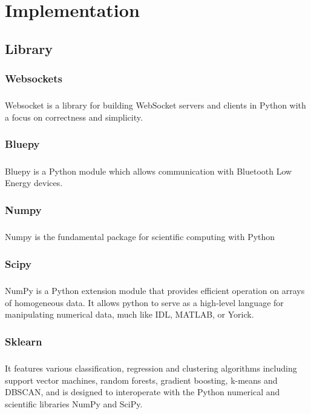 \chapter{Implementation}
\section{Library}
\subsection{Websockets}
\paragraph{}Websocket is a library for building WebSocket servers and clients in Python with a focus on correctness and simplicity.
\subsection{Bluepy}
\paragraph{}Bluepy is a Python module which allows communication with Bluetooth Low Energy devices.
\subsection{Numpy}
\paragraph{}Numpy is the fundamental package for scientific computing with Python
\subsection{Scipy}
\paragraph{}NumPy is a Python extension module that provides efficient operation on arrays of homogeneous data. It allows python to serve as a high-level language for manipulating numerical data, much like IDL, MATLAB, or Yorick.
\subsection{Sklearn}
\paragraph{}It features various classification, regression and clustering algorithms including support vector machines, random forests, gradient boosting, k-means and DBSCAN, and is designed to interoperate with the Python numerical and scientific libraries NumPy and SciPy.
